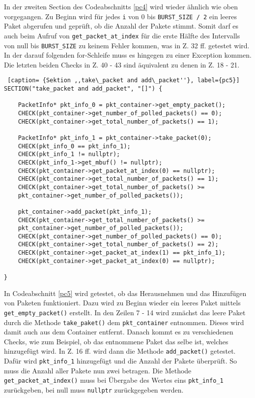 \documentclass[../review_3.tex]{subfiles}
\begin{document}
In der zweiten Section des Codeabschnitts \ref{pc4} wird wieder ähnlich wie oben vorgegangen. Zu Beginn wird für jedes \texttt{i} von 0 bis \texttt{BURST\_SIZE / 2} ein leeres Paket abgerufen und geprüft, ob die Anzahl der Pakete stimmt. Somit darf es auch beim Aufruf von \texttt{get\_packet\_at\_index} für die erste Hälfte des Intervalls von null bis \texttt{BURST\_SIZE} zu keinem Fehler kommen, was in Z. 32 ff. getestet wird. In der darauf folgenden for-Schleife muss es hingegen zu einer Exception kommen. Die letzten beiden Checks in Z. 40 - 43 sind äquivalent zu denen in Z. 18 - 21.

\begin{lstlisting} [caption= {Sektion ,,take\_packet and add\_packet''}, label={pc5}]
SECTION("take_packet and add_packet", "[]") {
    
    PacketInfo* pkt_info_0 = pkt_container->get_empty_packet();
    CHECK(pkt_container->get_number_of_polled_packets() == 0);
    CHECK(pkt_container->get_total_number_of_packets() == 1);
    
    PacketInfo* pkt_info_1 = pkt_container->take_packet(0);
    CHECK(pkt_info_0 == pkt_info_1);
    CHECK(pkt_info_1 != nullptr);
    CHECK(pkt_info_1->get_mbuf() != nullptr);
    CHECK(pkt_container->get_packet_at_index(0) == nullptr);
    CHECK(pkt_container->get_total_number_of_packets() == 1);
    CHECK(pkt_container->get_total_number_of_packets() >=
    pkt_container->get_number_of_polled_packets());
    
    pkt_container->add_packet(pkt_info_1);
    CHECK(pkt_container->get_total_number_of_packets() >=
    pkt_container->get_number_of_polled_packets());
    CHECK(pkt_container->get_number_of_polled_packets() == 0);
    CHECK(pkt_container->get_total_number_of_packets() == 2);
    CHECK(pkt_container->get_packet_at_index(1) == pkt_info_1);
    CHECK(pkt_container->get_packet_at_index(0) == nullptr);
    
}\end{lstlisting}

In Codeabschnitt \ref{pc5} wird getestet, ob das Herausnehmen und das Hinzufügen von Paketen funktioniert. Dazu wird zu Beginn wieder ein leeres Paket mittels \texttt{get\_empty\_packet()} erstellt. In den Zeilen 7 - 14 wird zunächst das leere Paket durch die Methode \texttt{take\_paket()} dem \texttt{pkt\_container} entnommen. Dieses wird damit auch aus dem Container entfernt. Danach kommt es zu verschiedenen Checks, wie zum Beispiel, ob das entnommene Paket das selbe ist, welches hinzugefügt wird. In Z. 16 ff. wird dann die Methode \texttt{add\_packet()} getestet. Dafür wird \texttt{pkt\_info\_1} hinzugefügt und die Anzahl der Pakete überprüft. So muss die Anzahl aller Pakete nun zwei betragen. Die Methode \texttt{get\_packet\_at\_index()} muss bei Übergabe des Wertes eins \texttt{pkt\_info\_1} zurückgeben, bei null muss \texttt{nullptr} zurückgegeben werden.
\end{document}
